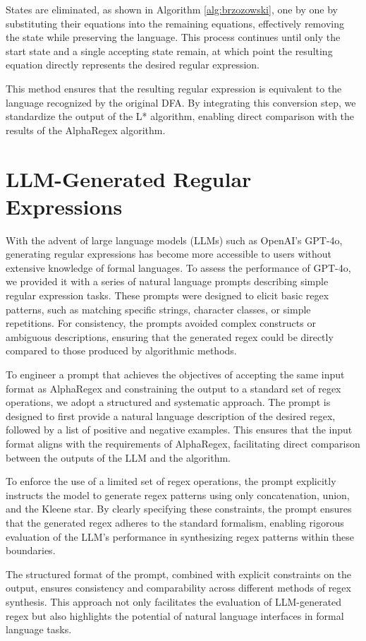 \indent\indent States are eliminated, as shown in Algorithm \ref{alg:brzozowski}, one by one by substituting their equations into the remaining equations, effectively removing the state while preserving the language. This process continues until only the start state and a single accepting state remain, at which point the resulting equation directly represents the desired regular expression.

\indent\indent This method ensures that the resulting regular expression is equivalent to the language recognized by the original DFA. By integrating this conversion step, we standardize the output of the L* algorithm, enabling direct comparison with the results of the AlphaRegex algorithm. \cite{brzozowski_1964_derivatives}

\vspace{-0.4em}
\section{LLM-Generated Regular Expressions}
\vspace{-0.4em}

\indent\indent With the advent of large language models (LLMs) such as OpenAI's GPT-4o, generating regular expressions has become more accessible to users without extensive knowledge of formal languages. To assess the performance of GPT-4o, we provided it with a series of natural language prompts describing simple regular expression tasks. These prompts were designed to elicit basic regex patterns, such as matching specific strings, character classes, or simple repetitions. For consistency, the prompts avoided complex constructs or ambiguous descriptions, ensuring that the generated regex could be directly compared to those produced by algorithmic methods.

\indent\indent To engineer a prompt that achieves the objectives of accepting the same input format as AlphaRegex and constraining the output to a standard set of regex operations, we adopt a structured and systematic approach. The prompt is designed to first provide a natural language description of the desired regex, followed by a list of positive and negative examples. This ensures that the input format aligns with the requirements of AlphaRegex, facilitating direct comparison between the outputs of the LLM and the algorithm.

\indent\indent To enforce the use of a limited set of regex operations, the prompt explicitly instructs the model to generate regex patterns using only concatenation, union, and the Kleene star. By clearly specifying these constraints, the prompt ensures that the generated regex adheres to the standard formalism, enabling rigorous evaluation of the LLM's performance in synthesizing regex patterns within these boundaries.

\indent\indent The structured format of the prompt, combined with explicit constraints on the output, ensures consistency and comparability across different methods of regex synthesis. This approach not only facilitates the evaluation of LLM-generated regex but also highlights the potential of natural language interfaces in formal language tasks.
